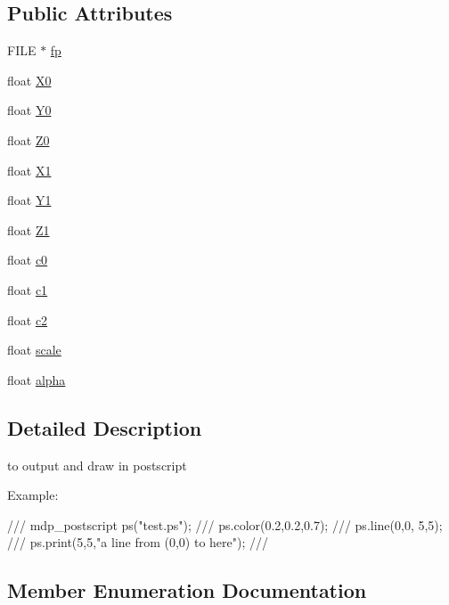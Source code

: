 \subsection*{Public Attributes}
\begin{DoxyCompactItemize}
\item 
F\+I\+LE $\ast$ \hyperlink{classmdp__postscript_a0d313085dea47b974fdd18ecb26622f1}{fp}
\item 
float \hyperlink{classmdp__postscript_a535f3c0036f5d89c139b003c0e909eed}{X0}
\item 
float \hyperlink{classmdp__postscript_acce7497a1e20c1c98708b95041faa274}{Y0}
\item 
float \hyperlink{classmdp__postscript_a5c27b031c6f79593b476dfa6a69e146f}{Z0}
\item 
float \hyperlink{classmdp__postscript_a71402d65d648f4c878dfe5eb74679efa}{X1}
\item 
float \hyperlink{classmdp__postscript_a812d1985306950bed3a2d858e8236b5b}{Y1}
\item 
float \hyperlink{classmdp__postscript_ac512287091dcecae1a549d005083554f}{Z1}
\item 
float \hyperlink{classmdp__postscript_a3160a1940a9fa4e99a0b138bc88769e9}{c0}
\item 
float \hyperlink{classmdp__postscript_a92dc6ce50f362fe93a1981b9a126073a}{c1}
\item 
float \hyperlink{classmdp__postscript_a26f42cf1f154707c463ecdd3f19f568f}{c2}
\item 
float \hyperlink{classmdp__postscript_ae0bd063ba78d27ad7ce541e78f512d3a}{scale}
\item 
float \hyperlink{classmdp__postscript_aca4cc1e7bee7fa702c643bdb1c69d6d0}{alpha}
\end{DoxyCompactItemize}


\subsection{Detailed Description}
to output and draw in postscript 

Example\+: \begin{DoxyVerb}///    mdp_postscript ps("test.ps");
///    ps.color(0.2,0.2,0.7);
///    ps.line(0,0,  5,5);
///    ps.print(5,5,"a line from (0,0) to here");
/// \end{DoxyVerb}
 

\subsection{Member Enumeration Documentation}
\mbox{\label{classmdp__postscript_a9a7e58c0e001105f4fe6d86a0a11348f}} 
